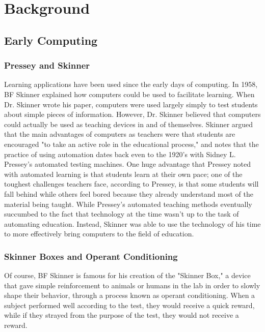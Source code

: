 \chapter{Background}
\section{Early Computing}

\subsection{Pressey and Skinner}
Learning applications have been used since the early days of computing. In 1958, BF Skinner \cite{skinner1958teaching} explained how computers could be used to facilitate learning. When Dr. Skinner wrote his paper, computers were used largely simply to test students about simple pieces of information. However, Dr. Skinner believed that computers could actually be used as teaching devices in and of themselves. Skinner argued that the main advantages of computers as teachers were that students are encouraged "to take an active role in the educational process," and notes that the practice of using automation dates back even to the 1920's with Sidney L. Pressey's automated testing machines. One huge advantage that Pressey noted with automated learning is that students learn at their own pace; one of the toughest challenges teachers face, according to Pressey, is that some students will fall behind while others feel bored because they already understand most of the material being taught. While Pressey's automated teaching methods eventually succumbed to the fact that technology at the time wasn't up to the task of automating education. Instead, Skinner was able to use the technology of his time to more effectively bring computers to the field of education.

\subsection{Skinner Boxes and Operant Conditioning}


Of course, BF Skinner is famous for his creation of the "Skinner Box," \cite{skinner1963operant} a device that gave simple reinforcement to animals or humans in the lab in order to slowly shape their behavior, through a process known as operant conditioning. When a subject performed well according to the test, they would receive a quick reward, while if they strayed from the purpose of the test, they would not receive a reward.

